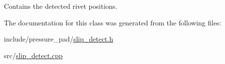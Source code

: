Contains the detected rivet positions. 



The documentation for this class was generated from the following files\-:\begin{DoxyCompactItemize}
\item 
include/pressure\-\_\-pad/\hyperlink{slip__detect_8h}{slip\-\_\-detect.\-h}\item 
src/\hyperlink{slip__detect_8cpp}{slip\-\_\-detect.\-cpp}\end{DoxyCompactItemize}
